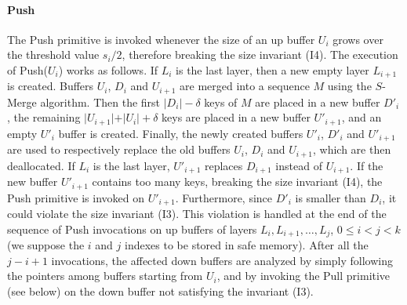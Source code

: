 \documentclass[review,number]{elsarticle}
\newcommand{\SMerge}{$S$-\textsf{Merge}}
\newcommand{\Push}{\textsf{Push}}
\newcommand{\Pull}{\textsf{Pull}}
\begin{document}
\paragraph{\Push{}} The \Push{} primitive is invoked whenever the size of an up
buffer $U_{i}$ grows over the threshold value $s_{i}/2$, therefore breaking the
size invariant (I4). 
The execution of \Push{}($U_{i}$) works as follows.
If $L_i$ is the last layer, then a new empty layer $L_{i+1}$ is
created. Buffers $U_{i}$, $D_{i}$ and
$U_{i+1}$ are merged into a sequence $M$ using the \SMerge{} algorithm. Then
the first $\vert D_{i} \vert - \delta$ keys of $M$ are placed in a new buffer
$D'_{i}$, the remaining $\vert U_{i+1} \vert + \vert U_{i} \vert + \delta$
keys are placed in a new buffer $U'_{i+1}$, and  an empty $U'_{i}$
buffer is created. Finally, the newly created buffers $U'_{i}$, $D'_{i}$ and
$U'_{i+1}$ are  used to respectively replace the old buffers $U_{i}$,
$D_{i}$ and $U_{i+1}$, which are then deallocated. If $L_{i}$ is the last layer,
$U'_{i+1}$ replaces $D_{i+1}$ instead of $U_{i+1}$. If the new buffer $U'_{i+1}$
contains too many keys, breaking  the size invariant (I4), the \Push{} primitive
is invoked on $U'_{i+1}$. Furthermore, since $D'_{i}$ is smaller than $D_{i}$,
it could violate the size invariant (I3). This violation is handled at the end
of the sequence of \Push{} invocations on up buffers of layers
$L_{i},L_{i+1},\ldots,L_{j}$, $0 \leq i < j < k$ (we suppose the $i$ and $j$
indexes to be stored in safe memory).  After all the $j-i+1$ invocations, the
affected down buffers are analyzed by simply following the pointers among
buffers starting from $U_{i}$, and by invoking the \Pull{} primitive (see below)
on the down buffer not satisfying the invariant (I3). 
\end{document}
